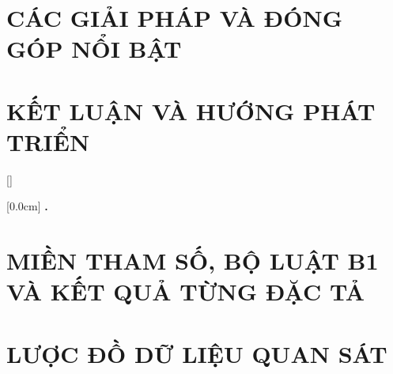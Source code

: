 \documentclass[a4paper,twoside]{report}
\theoremstyle{definition}
\begin{document}
\chapter{CÁC GIẢI PHÁP VÀ ĐÓNG GÓP NỔI BẬT}
\label{chapter:SolutionAndContribution}

\newpage
\chapter{KẾT LUẬN VÀ HƯỚNG PHÁT TRIỂN} %
\label{chapter:conclusion}



\newpage
\renewcommand\bibname{TÀI LIỆU THAM KHẢO}
\printbibliography

\appendixpage
\appendices
\addappheadtotoc


{}[]
\titlespacing*{\chapter}{0pt}{-20pt}{20pt}

    [0.0cm]             %
    {\bfseries\vspace{0.3cm}}                  %
    {{\bfseries{\scshape} \thecontentslabel.\ }} %
    {}         %
    {\contentspage}         %
\chapter{MIỀN THAM SỐ, BỘ LUẬT B1 VÀ KẾT QUẢ TỪNG ĐẶC TẢ}

\newpage
\chapter{LƯỢC ĐỒ DỮ LIỆU QUAN SÁT}

\end{document}
